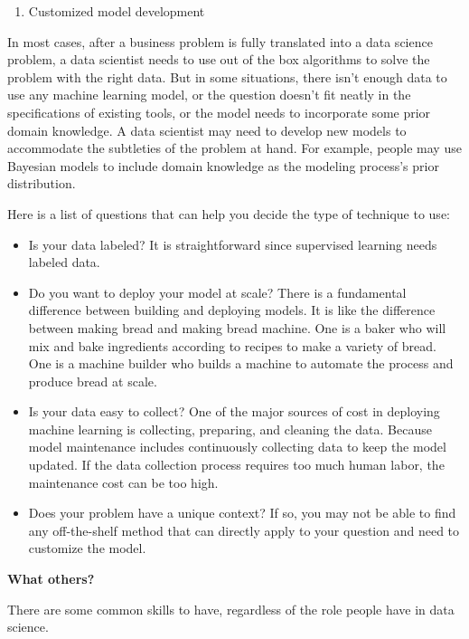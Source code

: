 \documentclass[
  12pt,
]{krantz}
\providecommand{\tightlist}{%
  \setlength{\itemsep}{0pt}\setlength{\parskip}{0pt}}
\begin{document}
\begin{enumerate}
\def\labelenumi{(\arabic{enumi})}
\setcounter{enumi}{2}
\tightlist
\item
  Customized model development
\end{enumerate}

In most cases, after a business problem is fully translated into a data science problem, a data scientist needs to use out of the box algorithms to solve the problem with the right data. But in some situations, there isn't enough data to use any machine learning model, or the question doesn't fit neatly in the specifications of existing tools, or the model needs to incorporate some prior domain knowledge. A data scientist may need to develop new models to accommodate the subtleties of the problem at hand. For example, people may use Bayesian models to include domain knowledge as the modeling process's prior distribution.

Here is a list of questions that can help you decide the type of technique to use:

\begin{itemize}
\item
  Is your data labeled? It is straightforward since supervised learning needs labeled data.
\item
  Do you want to deploy your model at scale? There is a fundamental difference between building and deploying models. It is like the difference between making bread and making bread machine. One is a baker who will mix and bake ingredients according to recipes to make a variety of bread. One is a machine builder who builds a machine to automate the process and produce bread at scale.
\item
  Is your data easy to collect? One of the major sources of cost in deploying machine learning is collecting, preparing, and cleaning the data. Because model maintenance includes continuously collecting data to keep the model updated. If the data collection process requires too much human labor, the maintenance cost can be too high.
\item
  Does your problem have a unique context? If so, you may not be able to find any off-the-shelf method that can directly apply to your question and need to customize the model.
\end{itemize}

\textbf{What others?}

There are some common skills to have, regardless of the role people have in data science.
\end{document}
